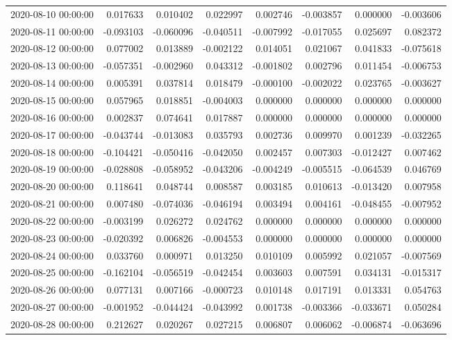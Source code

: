 \begin{tabular}{lrrrrrrr}
2020-08-10 00:00:00 & 0.017633 & 0.010402 & 0.022997 & 0.002746 & -0.003857 & 0.000000 & -0.003606 \\
2020-08-11 00:00:00 & -0.093103 & -0.060096 & -0.040511 & -0.007992 & -0.017055 & 0.025697 & 0.082372 \\
2020-08-12 00:00:00 & 0.077002 & 0.013889 & -0.002122 & 0.014051 & 0.021067 & 0.041833 & -0.075618 \\
2020-08-13 00:00:00 & -0.057351 & -0.002960 & 0.043312 & -0.001802 & 0.002796 & 0.011454 & -0.006753 \\
2020-08-14 00:00:00 & 0.005391 & 0.037814 & 0.018479 & -0.000100 & -0.002022 & 0.023765 & -0.003627 \\
2020-08-15 00:00:00 & 0.057965 & 0.018851 & -0.004003 & 0.000000 & 0.000000 & 0.000000 & 0.000000 \\
2020-08-16 00:00:00 & 0.002837 & 0.074641 & 0.017887 & 0.000000 & 0.000000 & 0.000000 & 0.000000 \\
2020-08-17 00:00:00 & -0.043744 & -0.013083 & 0.035793 & 0.002736 & 0.009970 & 0.001239 & -0.032265 \\
2020-08-18 00:00:00 & -0.104421 & -0.050416 & -0.042050 & 0.002457 & 0.007303 & -0.012427 & 0.007462 \\
2020-08-19 00:00:00 & -0.028808 & -0.058952 & -0.043206 & -0.004249 & -0.005515 & -0.064539 & 0.046769 \\
2020-08-20 00:00:00 & 0.118641 & 0.048744 & 0.008587 & 0.003185 & 0.010613 & -0.013420 & 0.007958 \\
2020-08-21 00:00:00 & 0.007480 & -0.074036 & -0.046194 & 0.003494 & 0.004161 & -0.048455 & -0.007952 \\
2020-08-22 00:00:00 & -0.003199 & 0.026272 & 0.024762 & 0.000000 & 0.000000 & 0.000000 & 0.000000 \\
2020-08-23 00:00:00 & -0.020392 & 0.006826 & -0.004553 & 0.000000 & 0.000000 & 0.000000 & 0.000000 \\
2020-08-24 00:00:00 & 0.033760 & 0.000971 & 0.013250 & 0.010109 & 0.005992 & 0.021057 & -0.007569 \\
2020-08-25 00:00:00 & -0.162104 & -0.056519 & -0.042454 & 0.003603 & 0.007591 & 0.034131 & -0.015317 \\
2020-08-26 00:00:00 & 0.077131 & 0.007166 & -0.000723 & 0.010148 & 0.017191 & 0.013331 & 0.054763 \\
2020-08-27 00:00:00 & -0.001952 & -0.044424 & -0.043992 & 0.001738 & -0.003366 & -0.033671 & 0.050284 \\
2020-08-28 00:00:00 & 0.212627 & 0.020267 & 0.027215 & 0.006807 & 0.006062 & -0.006874 & -0.063696 \\

\end{tabular}
